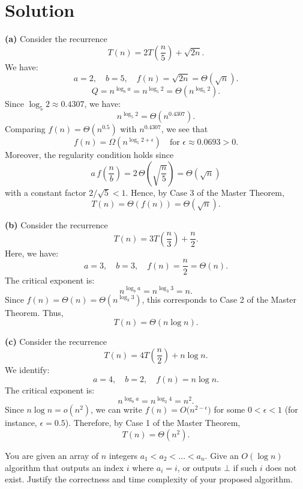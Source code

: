 \documentclass[11pt]{article}
\begin{document}
    \section*{Solution}

    \textbf{(a) } Consider the recurrence 
    \[
    T(n)=2T\left(\frac{n}{5}\right)+\sqrt{2n}.
    \]
    We have:
    \[
    a=2,\quad b=5,\quad f(n)=\sqrt{2n}=\Theta(\sqrt{n}).
    \]
    \[
    Q = n^{\log_b a}=n^{\log_5 2}=\Theta\left(n^{\log_5 2}\right).
    \]
    Since \(\log_5 2\approx 0.4307\), we have:
    \[
    n^{\log_5 2} = \Theta\left(n^{0.4307}\right).
    \]
    Comparing \(f(n)=\Theta\left(n^{0.5}\right)\) with \(n^{0.4307}\), we see that
    \[
    f(n)=\Omega\left(n^{\log_5 2+\epsilon}\right) \quad \text{for } \epsilon\approx 0.0693>0.
    \]
    Moreover, the regularity condition holds since
    \[
    a\, f\left(\frac{n}{b}\right)=2\,\Theta\left(\sqrt{\frac{n}{5}}\right)=\Theta\left(\sqrt{n}\right)
    \]
    with a constant factor \(2/\sqrt{5}<1\). Hence, by Case 3 of the Master Theorem,
    \[
    T(n)=\Theta\left(f(n)\right)=\Theta\left(\sqrt{n}\right).
    \]

    \bigskip

    \textbf{(b) } Consider the recurrence 
    \[
    T(n)=3T\left(\frac{n}{3}\right)+\frac{n}{2}.
    \]
    Here, we have:
    \[
    a=3,\quad b=3,\quad f(n)=\frac{n}{2}=\Theta(n).
    \]
    The critical exponent is:
    \[
    n^{\log_b a}=n^{\log_3 3}=n.
    \]
    Since \(f(n)=\Theta(n)=\Theta\left(n^{\log_3 3}\right)\), this corresponds to Case 2 of the Master Theorem. Thus,
    \[
    T(n)=\Theta(n\log n).
    \]

    \bigskip

    \textbf{(c) } Consider the recurrence 
    \[
    T(n)=4T\left(\frac{n}{2}\right)+n\log n.
    \]
    We identify:
    \[
    a=4,\quad b=2,\quad f(n)=n\log n.
    \]
    The critical exponent is:
    \[
    n^{\log_b a}=n^{\log_2 4}=n^2.
    \]
    Since \(n\log n = o(n^2)\), we can write \(f(n)=O\big(n^{2-\epsilon}\big)\) for some \(0<\epsilon<1\) (for instance, \(\epsilon=0.5\)). Therefore, by Case 1 of the Master Theorem,
    \[
    T(n)=\Theta(n^2).
    \]
    \newpage
    
    \begin{tcolorbox}[title={Problem 2 (Array Search, 30 pts)}]
        You are given an array of $n$ integers $a_1 < a_2 < \dots < a_n$. Give an $O(\log n)$ algorithm that outputs an index $i$ where $a_i = i$, or outputs $\bot$ if such $i$ does not exist. Justify the correctness and time complexity of your proposed algorithm.
    \end{tcolorbox}
    
\end{document}
